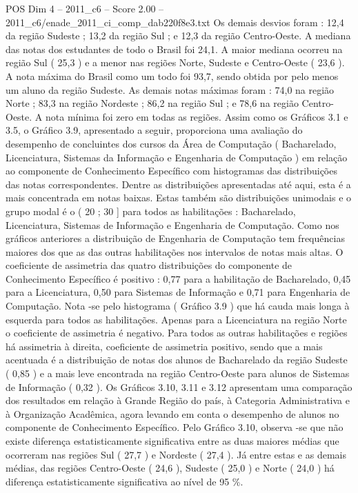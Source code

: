 \begin{textsample}{POS Dim 4 – 2011\_c6 – Score 2.00 – 2011\_c6/enade\_2011\_ci\_comp\_dab220f8e3.txt}
Os demais desvios foram : 12,4 da região Sudeste ; 13,2 da região Sul ; e 12,3 da região Centro-Oeste.
A mediana das notas dos estudantes de todo o Brasil foi 24,1.
A maior mediana ocorreu na região Sul ( 25,3 ) e a menor nas regiões Norte, Sudeste e Centro-Oeste ( 23,6 ).
A nota máxima do Brasil como um todo foi 93,7, sendo obtida por pelo menos um aluno da região Sudeste.
As demais notas máximas foram : 74,0 na região Norte ; 83,3 na região Nordeste ; 86,2 na região Sul ; e 78,6 na região Centro-Oeste.
A nota mínima foi zero em todas as regiões.
Assim como os Gráficos 3.1 e 3.5, o Gráfico 3.9, apresentado a seguir, proporciona uma avaliação do desempenho de concluintes dos cursos da Área de Computação ( Bacharelado, Licenciatura, Sistemas da Informação e Engenharia de Computação ) em relação ao componente de Conhecimento Específico com histogramas das distribuições das notas correspondentes.
Dentre as distribuições apresentadas até aqui, esta é a mais concentrada em notas baixas.
Estas também são distribuições unimodais e o grupo modal é o ( 20 ; 30 ] para todos as habilitações : Bacharelado, Licenciatura, Sistemas de Informação e Engenharia de Computação.
Como nos gráficos anteriores a distribuição de Engenharia de Computação tem frequências maiores dos que as das outras habilitações nos intervalos de notas mais altas.
O coeficiente de assimetria das quatro distribuições do componente de Conhecimento Específico é positivo : 0,77 para a habilitação de Bacharelado, 0,45 para a Licenciatura, 0,50 para Sistemas de Informação e 0,71 para Engenharia de Computação.
Nota -se pelo histograma ( Gráfico 3.9 ) que há cauda mais longa à esquerda para todos as habilitações.
Apenas para a Licenciatura na região Norte o coeficiente de assimetria é negativo.
Para todos as outras habilitações e regiões há assimetria à direita, coeficiente de assimetria positivo, sendo que a mais acentuada é a distribuição de notas dos alunos de Bacharelado da região Sudeste ( 0,85 ) e a mais leve encontrada na região Centro-Oeste para alunos de Sistemas de Informação ( 0,32 ).
Os Gráficos 3.10, 3.11 e 3.12 apresentam uma comparação dos resultados em relação à Grande Região do país, à Categoria Administrativa e à Organização Acadêmica, agora levando em conta o desempenho de alunos no componente de Conhecimento Específico.
Pelo Gráfico 3.10, observa -se que não existe diferença estatisticamente significativa entre as duas maiores médias que ocorreram nas regiões Sul ( 27,7 ) e Nordeste ( 27,4 ).
Já entre estas e as demais médias, das regiões Centro-Oeste ( 24,6 ), Sudeste ( 25,0 ) e Norte ( 24,0 ) há diferença estatisticamente significativa ao nível de 95 \%.

\end{textsample}
